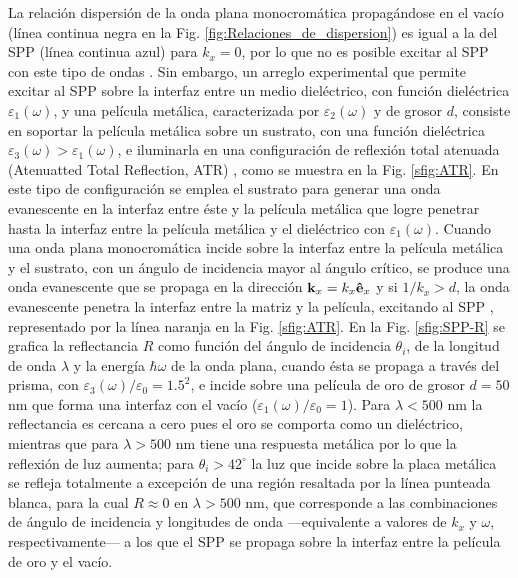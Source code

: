 La relación dispersión de la onda plana monocromática propagándose en el vacío (línea continua negra en la Fig. \ref{fig:Relaciones_de_dispersion})  es igual a la del SPP (línea continua azul) para  $k_x=0$, por lo que no es posible excitar al SPP con este tipo de ondas \cite{trugler2011properties}. Sin embargo, un arreglo experimental que permite excitar al SPP sobre la interfaz entre un medio dieléctrico, con función dieléctrica $\varepsilon_1(\omega)$, y una película  metálica, caracterizada por $\varepsilon_2(\omega)$ y de grosor $d$, consiste en soportar la película metálica sobre un sustrato, con una función dieléctrica $\varepsilon_3(\omega)>\varepsilon_1(\omega)$, e iluminarla en una configuración de reflexión total atenuada (Atenuatted Total Reflection, ATR) \cite{kabashin2009plasmonic,trugler2011properties}, como se muestra en la Fig. \ref{sfig:ATR}. En este tipo de configuración se emplea el sustrato para generar una onda evanescente en la interfaz entre éste y la película metálica que logre penetrar hasta la interfaz entre la película metálica y el dieléctrico con $\varepsilon_1(\omega)$. Cuando una onda plana monocromática incide sobre la interfaz entre la película metálica y el sustrato, con un ángulo de incidencia mayor al ángulo crítico, se produce una onda evanescente que se propaga en la dirección $\vb{k}_x=k_x\vu{e}_x$ y si $1/k_x>d$, la onda evanescente penetra la interfaz entre la matriz y la película, excitando al SPP \cite{trugler2011properties}, representado por la línea naranja en la Fig. \ref{sfig:ATR}. En la Fig. \ref{sfig:SPP-R} se grafica la reflectancia $R$ como función del ángulo de incidencia $\theta_i$, de la longitud de onda $\lambda$ y la energía $\hbar\omega$ de la onda plana, cuando ésta se propaga a través del prisma, con $\varepsilon_3(\omega)/\varepsilon_0 = 1.5^2$, e incide sobre una película de oro de grosor $d=50$ nm que forma una interfaz con el vacío ($\varepsilon_1(\omega)/\varepsilon_0 = 1$). Para $\lambda<500$ nm la reflectancia es cercana a cero pues el oro se comporta como un dieléctrico, mientras que para $\lambda>500$ nm tiene una respuesta metálica por lo que la reflexión de luz aumenta; para $\theta_i>42^\circ$ la luz que incide sobre la placa metálica se refleja totalmente a excepción de una región resaltada por la línea punteada blanca, para la cual $R\approx 0$ en $\lambda>500$ nm, que  corresponde a las combinaciones de ángulo de incidencia y longitudes de onda ---equivalente a valores de $k_x$ y $\omega$, respectivamente--- a los que el SPP se propaga sobre la interfaz entre la película de oro y el vacío.
			
